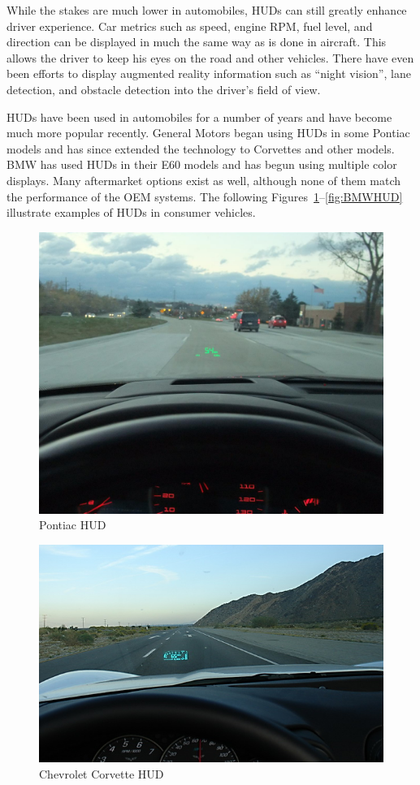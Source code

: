 While the stakes are much lower in automobiles, HUDs can still greatly
enhance driver experience. Car metrics such as speed, engine RPM, fuel
level, and direction can be displayed in much the same way as is done in
aircraft. This allows the driver to keep his eyes on the road and other
vehicles. There have even been efforts to display augmented reality
information such as ``night vision'', lane detection, and obstacle detection
into the driver's field of view.

HUDs have been used in automobiles for a number of years and have become
much more popular recently. General Motors began using HUDs in some Pontiac
models and has since extended the technology to Corvettes and other models.
BMW has used HUDs in their E60 models and has begun using multiple color
displays. Many aftermarket options exist as well, although none of them
match the performance of the OEM systems. The following
Figures~\ref{fig:PontiacHUD}--\ref{fig:BMWHUD} illustrate examples of HUDs
in consumer vehicles.

\begin{figure}
	\includegraphics[width=\textwidth]{img/PontiacHUD.jpg}
	\caption{Pontiac HUD}
	\label{fig:PontiacHUD}
\end{figure}

\begin{figure}
	\includegraphics[width=\textwidth]{img/CorvetteHUD.jpg}
	\caption{Chevrolet Corvette HUD}
	\label{fig:CorvetteHUD}
\end{figure}


